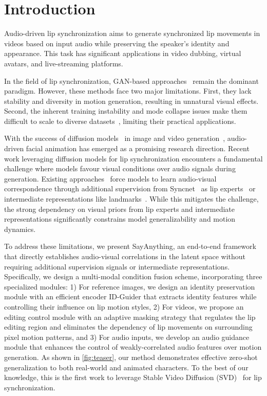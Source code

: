 

\section{Introduction}

Audio-driven lip synchronization aims to generate synchronized lip movements in videos based on input audio while preserving the speaker's identity and appearance. This task has significant applications in video dubbing, virtual avatars, and live-streaming platforms.

In the field of lip synchronization, GAN-based approaches~\citep{guan2023stylesync,su2024audio} remain the dominant paradigm. However, these methods face two major limitations. First, they lack stability and diversity in motion generation, resulting in unnatural visual effects. Second, the inherent training instability and mode collapse issues make them difficult to scale to diverse datasets~\citep{heusel2017gans}, limiting their practical applications.


With the success of diffusion models~\citep{ho2020denoising,song2020score} in image and video generation~\citep{blattmann2023stable,rombach2022high}, audio-driven facial animation has emerged as a promising research direction. Recent work leveraging diffusion models for lip synchronization encounters a fundamental challenge where models favour visual conditions over audio signals during generation. Existing approaches~\citep{mukhopadhyay2024diff2lip,li2024latentsync,shen2023difftalk,zhong2024high} force models to learn audio-visual correspondence through additional supervision from Syncnet~\citep{chung2017out} as lip experts~\citep{mukhopadhyay2024diff2lip,li2024latentsync} or intermediate representations like landmarks~\citep{shen2023difftalk,zhong2024high}. While this mitigates the challenge, the strong dependency on visual priors from lip experts and intermediate representations significantly constrains model generalizability and motion dynamics.

To address these limitations, we present SayAnything, an end-to-end framework that directly establishes audio-visual correlations in the latent space without requiring additional supervision signals or intermediate representations. Specifically, we design a multi-modal condition fusion scheme, incorporating three specialized modules: 1) For reference images, we design an identity preservation module with an efficient encoder ID-Guider that extracts identity features while controlling their influence on lip motion styles, 2) For videos, we propose an editing control module with an adaptive masking strategy that regulates the lip editing region and eliminates the dependency of lip movements on surrounding pixel motion patterns, and 3) For audio inputs, we develop an audio guidance module that enhances the control of weakly-correlated audio features over motion generation. As shown in \cref{fig:teaser}, our method demonstrates effective zero-shot generalization to both real-world and animated characters. To the best of our knowledge, this is the first work to leverage Stable Video Diffusion (SVD)~\citep{blattmann2023stable} for lip synchronization.

